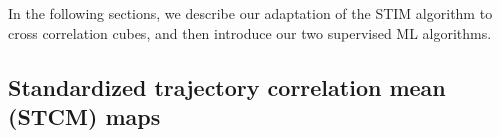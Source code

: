 \documentclass{aa}
\begin{document}
In the following sections, we describe our adaptation of the STIM algorithm to cross correlation cubes, and then introduce our two supervised ML algorithms.

\subsection{Standardized trajectory correlation mean (STCM) maps}
\end{document}
